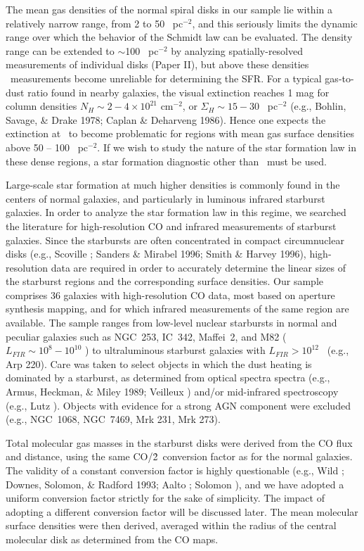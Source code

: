 The mean gas densities of the normal spiral disks in our sample
lie within a relatively narrow range,  
from 2 to 50 \msun~pc$^{-2}$, and this seriously 
limits the dynamic range over which the behavior of the Schmidt law
can be evaluated.  The density range can be extended to  
$\sim$100 \msun~pc$^{-2}$
by analyzing spatially-resolved measurements of individual disks 
(Paper II), but above these densities \halpha\ measurements become 
unreliable for determining the SFR.  For a typical gas-to-dust ratio 
found in nearby galaxies, the visual extinction reaches 1 mag for   
column densities $N_H \sim 2 - 4 \times 10^{21}$ cm$^{-2}$, or $\Sigma_H \sim  
15 - 30$ \msun~pc$^{-2}$ (e.g., Bohlin, Savage, \& Drake 1978; Caplan 
\& Deharveng 1986).  Hence one expects 
the extinction at \halpha\ to become problematic for regions with mean gas 
surface densities above 
50 -- 100 \msun~pc$^{-2}$.  If we wish to study the nature of the 
star formation law in these dense regions, a star formation diagnostic 
other than \halpha\ must be used.  

Large-scale star formation at much higher densities is commonly found in the
centers of normal galaxies, and particularly in luminous infrared
starburst galaxies.  In order to analyze the star
formation law in this regime, we searched the literature for 
high-resolution CO and infrared measurements of starburst galaxies. 
Since the starbursts are often concentrated in compact circumnuclear disks
(e.g., Scoville ; Sanders \& Mirabel 1996; Smith \& Harvey 1996), 
high-resolution data are required in order to accurately determine the
linear sizes of the starburst regions and the corresponding surface
densities.  Our sample comprises 36 galaxies with 
high-resolution CO data, most based on aperture synthesis mapping, and 
for which infrared measurements of the same region are available.  The 
sample ranges from low-level nuclear starbursts in normal and peculiar 
galaxies such as NGC~253, IC~342, Maffei~2, and M82 
($L_{FIR} \sim 10^8 - 10^{10}$ \lsun) to 
ultraluminous starburst galaxies with $L_{FIR} > 10^{12}$ \lsun\ 
(e.g., Arp 220).  Care was taken to select objects in which the dust
heating is dominated by a starburst, as determined from optical spectra
spectra (e.g., Armus, Heckman, \& Miley 1989; Veilleux \etal 1995) 
and/or mid-infrared spectroscopy
(e.g., Lutz ).  Objects with evidence for a strong AGN component
were excluded (e.g., NGC~1068, NGC~7469, Mrk 231, Mrk 273).  

Total molecular gas masses in the starburst disks 
were derived from the CO flux and distance, using the same 
CO/\h2\ conversion factor as for the normal galaxies.  The validity of 
a constant conversion factor is highly questionable (e.g., Wild 
\etal 1992; Downes, Solomon, \& Radford 1993; Aalto \etal 1994; 
Solomon \etal 1997), and we have adopted a uniform conversion factor
strictly for the sake of simplicity.  
The impact of adopting a different conversion
factor will be discussed later.  
The mean molecular surface densities were then derived, averaged 
within the radius of the central molecular disk as determined from the
CO maps.  

